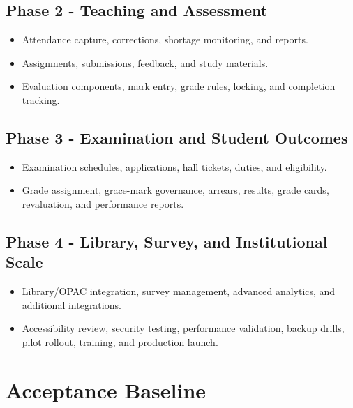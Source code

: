 \documentclass[10pt,a4paper]{article}
\begin{document}
\subsection{Phase 2 - Teaching and Assessment}
\begin{itemize}
  \item Attendance capture, corrections, shortage monitoring, and reports.
  \item Assignments, submissions, feedback, and study materials.
  \item Evaluation components, mark entry, grade rules, locking, and completion tracking.
\end{itemize}

\subsection{Phase 3 - Examination and Student Outcomes}
\begin{itemize}
  \item Examination schedules, applications, hall tickets, duties, and eligibility.
  \item Grade assignment, grace-mark governance, arrears, results, grade cards,
        revaluation, and performance reports.
\end{itemize}

\subsection{Phase 4 - Library, Survey, and Institutional Scale}
\begin{itemize}
  \item Library/OPAC integration, survey management, advanced analytics, and additional integrations.
  \item Accessibility review, security testing, performance validation, backup drills,
        pilot rollout, training, and production launch.
\end{itemize}

\section{Acceptance Baseline}
\end{document}
